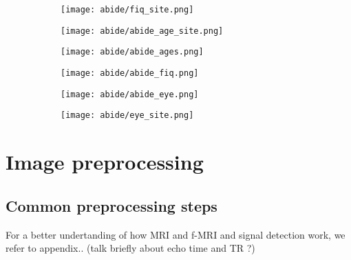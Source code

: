 \documentclass[a4paper,11pt]{article}
\begin{document}
\begin{figure}
\centering
\begin{subfigure}{0.9\textwidth}
\texttt{[image: abide/fiq\_site.png]}
\caption{}
\label{fig:abideages}
\end{subfigure}
\begin{subfigure}{0.9\textwidth}
\texttt{[image: abide/abide\_age\_site.png]}
\caption{}
\label{fig:abidefiq}
\end{subfigure}
\caption{}
\label{}
\end{figure}



\begin{figure}
\begin{subfigure}{0.5\textwidth}
\texttt{[image: abide/abide\_ages.png]}
\caption{}
\label{fig:abideages}
\end{subfigure}
\begin{subfigure}{0.5\textwidth}
\texttt{[image: abide/abide\_fiq.png]}
\caption{}
\label{fig:abidefiq}
\end{subfigure}
\caption{}
\label{}
\end{figure}



\begin{figure}
\begin{subfigure}{0.4\linewidth}
\texttt{[image: abide/abide\_eye.png]}
\caption{}
\label{fig:abideeye}
\end{subfigure}
\begin{subfigure}{0.7\linewidth}
\texttt{[image: abide/eye\_site.png]}
\caption{}
\label{fig:abideeyesite}
\end{subfigure}
\hspace{0.1 cm}
\caption{}
\label{}
\end{figure}






\section{Image preprocessing}
\subsection{Common preprocessing steps}
\label{sec:preprocessing_steps}
For a better undertanding of how MRI and f-MRI and signal detection work, we refer to appendix..
(talk briefly about echo time and TR ?)
\end{document}
